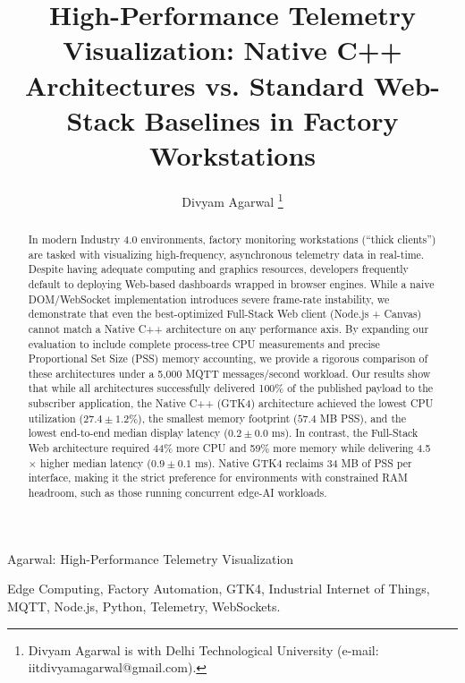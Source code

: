 \documentclass[lettersize,journal]{IEEEtran}
\begin{document}
\title{High-Performance Telemetry Visualization: Native C++ Architectures vs. Standard Web-Stack Baselines in Factory Workstations}

\author{Divyam Agarwal%
\thanks{Divyam Agarwal is with Delhi Technological University (e-mail: iitdivyamagarwal@gmail.com).}}

%
{Agarwal: High-Performance Telemetry Visualization}

\maketitle

\begin{abstract}
In modern Industry 4.0 environments, factory monitoring workstations (``thick clients'') are tasked with visualizing high-frequency, asynchronous telemetry data in real-time. Despite having adequate computing and graphics resources, developers frequently default to deploying Web-based dashboards wrapped in browser engines. While a naive DOM/WebSocket implementation introduces severe frame-rate instability, we demonstrate that even the best-optimized Full-Stack Web client (Node.js + Canvas) cannot match a Native C++ architecture on any performance axis. By expanding our evaluation to include complete process-tree CPU measurements and precise Proportional Set Size (PSS) memory accounting, we provide a rigorous comparison of these architectures under a 5,000 MQTT messages/second workload. Our results show that while all architectures successfully delivered 100\% of the published payload to the subscriber application, the Native C++ (GTK4) architecture achieved the lowest CPU utilization ($27.4 \pm 1.2\%$), the smallest memory footprint ($57.4$ MB PSS), and the lowest end-to-end median display latency ($0.2 \pm 0.0$ ms). In contrast, the Full-Stack Web architecture required 44\% more CPU and 59\% more memory while delivering 4.5$\times$ higher median latency ($0.9 \pm 0.1$ ms). Native GTK4 reclaims 34 MB of PSS per interface, making it the strict preference for environments with constrained RAM headroom, such as those running concurrent edge-AI workloads.
\end{abstract}

\begin{IEEEkeywords}
Edge Computing, Factory Automation, GTK4, Industrial Internet of Things, MQTT, Node.js, Python, Telemetry, WebSockets.
\end{IEEEkeywords}
\end{document}
